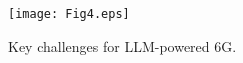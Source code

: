 


\begin{figure}[t!]
\centering
\texttt{[image: Fig4.eps]}
    \caption{Key challenges for \gls{LLM}-powered 6G.}
    \label{fig:LNF_challenges}
\end{figure}

